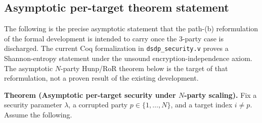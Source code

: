 \documentclass[11pt]{article}
\begin{document}
\subsection*{Asymptotic per-target theorem statement}

The following is the precise asymptotic statement that the path-(b) reformulation of the formal development is intended to carry once the 3-party case is discharged. The current Coq formalization in \texttt{dsdp\_security.v} proves a Shannon-entropy statement under the unsound encryption-independence axiom. The asymptotic $N$-party Hunp/RoR theorem below is the target of that reformulation, not a proven result of the existing development.

\textbf{Theorem (Asymptotic per-target security under $N$-party scaling).} Fix a security parameter $\lambda$, a corrupted party $p \in \{1, \ldots, N\}$, and a target index $i \neq p$. Assume the following.
\end{document}
